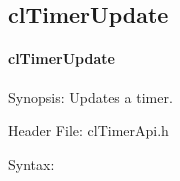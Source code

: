 \begin{flushleft}
\subsection{clTimerUpdate}
\hypertarget{pagetmr110}{}\paragraph{cl\-Timer\-Update}\label{pagetmr110}
\begin{Desc}
\item[Synopsis:]Updates a timer.\end{Desc}
\begin{Desc}
\item[Header File:]clTimerApi.h\end{Desc}
\begin{Desc}
\item[Syntax:]


\end{Desc}
\end{flushleft}
